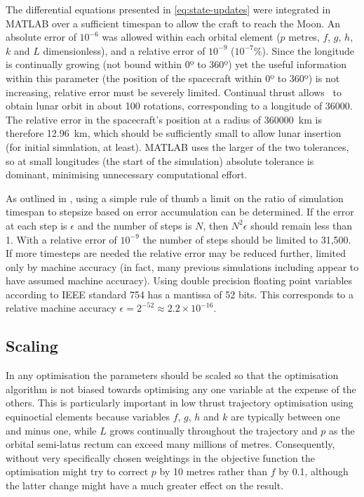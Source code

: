 The differential equations presented in \autoref{eq:state-updates} were integrated in MATLAB over a sufficient timespan to allow the craft to reach the Moon. An absolute error of $10^{-6}$ was allowed within each orbital element ($p$ metres, $f$, $g$, $h$, $k$ and $L$ dimensionless), and a relative error of $10^{-9}$ ($10^{-7}$\%). Since the longitude is continually growing (not bound within 0º to 360º) yet the useful information within this parameter (the position of the spacecraft within 0º to 360º) is not increasing, relative error must be severely limited. Continual thrust allows \BW\ to obtain lunar orbit in about 100 rotations, corresponding to a longitude of 36000\degrees. The relative error in the spacecraft's position at a radius of 360000~km is therefore 12.96~km, which should be sufficiently small to allow lunar insertion (for initial simulation, at least). MATLAB uses the larger of the two tolerances, so at small longitudes (the start of the simulation) absolute tolerance is dominant, minimising unnecessary computational effort.

As outlined in \textcite{Milani1987}, using a simple rule of thumb a limit on the ratio of simulation timespan to stepsize based on error accumulation can be determined. If the error at each step is $\epsilon$ and the number of steps is $N$, then $N^{2}\epsilon$ should remain less than 1. With a relative error of $10^{-9}$ the number of steps should be limited to 31,500. If more timesteps are needed the relative error may be reduced further, limited only by machine accuracy (in fact, many previous simulations including \citeauthor{Milani1987} appear to have assumed machine accuracy). Using double precision floating point variables according to IEEE standard 754 has a mantissa of 52 bits. This corresponds to a relative machine accuracy $\epsilon=2^{-52}\approx2.2\times10^{-16}$.

\subsection{Scaling} \label{sub:Scaling}

In any optimisation the parameters should be scaled so that the optimisation algorithm is not biased towards optimising any one variable at the expense of the others. This is particularly important in low thrust trajectory optimisation using equinoctial elements because variables $f$, $g$, $h$ and $k$ are typically between one and minus one, while $L$ grows continually throughout the trajectory and $p$ as the orbital semi-latus rectum can exceed many millions of metres. Consequently, without very specifically chosen weightings in the objective function the optimisation might try to correct $p$ by 10 metres rather than $f$ by 0.1, although the latter change might have a much greater effect on the result.


